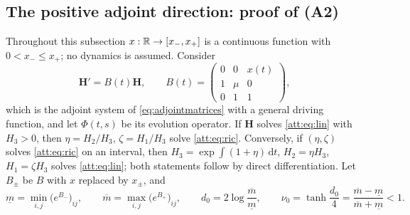 \subsection{The positive adjoint direction: proof of (A2)}\label{att:sec:adjoint}
Throughout this subsection $x:\mathbb R\to[x_-,x_+]$ is a continuous function with $0<x_-\le x_+$; no dynamics is assumed. Consider
\begin{equation}\label{att:eq:lin}
\mathbf H'=B(t)\mathbf H,\qquad B(t)=\begin{pmatrix}0&0&x(t)\\1&\mu&0\\0&1&1\end{pmatrix},
\end{equation}
which is the adjoint system of \eqref{eq:adjointmatrices} with a general driving function, and let $\Phi(t,s)$ be its evolution operator. If $\mathbf H$ solves \eqref{att:eq:lin} with $H_3>0$, then $\eta=H_2/H_3$, $\zeta=H_1/H_3$ solve \eqref{att:eq:ric}. Conversely, if $(\eta,\zeta)$ solves \eqref{att:eq:ric} on an interval, then $H_3=\exp\int(1+\eta)\,\mathrm dt$, $H_2=\eta H_3$, $H_1=\zeta H_3$ solves \eqref{att:eq:lin}; both statements follow by direct differentiation. Let $B_\pm$ be $B$ with $x$ replaced by $x_\pm$, and
\begin{equation}\label{att:eq:birkhoff}
\underline m=\min_{i,j}\bigl(e^{B_-}\bigr)_{ij},\qquad \overline m=\max_{i,j}\bigl(e^{B_+}\bigr)_{ij},\qquad
d_0=2\log\frac{\overline m}{\underline m},\qquad \nu_0=\tanh\frac{d_0}{4}=\frac{\overline m-\underline m}{\overline m+\underline m}<1 .
\end{equation}

